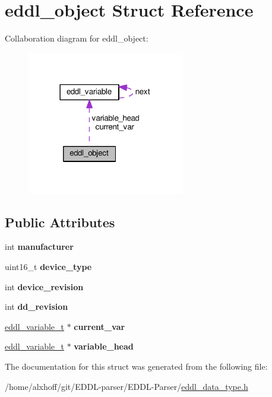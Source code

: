 \hypertarget{structeddl__object}{}\section{eddl\+\_\+object Struct Reference}
\label{structeddl__object}


Collaboration diagram for eddl\+\_\+object\+:\nopagebreak
\begin{figure}[H]
\begin{center}
\leavevmode
\includegraphics[width=194pt]{structeddl__object__coll__graph}
\end{center}
\end{figure}
\subsection*{Public Attributes}
\begin{DoxyCompactItemize}
\item 
int {\bfseries manufacturer}\hypertarget{structeddl__object_a068ca2f55a0ca714f6ae4081404ebcb8}{}\label{structeddl__object_a068ca2f55a0ca714f6ae4081404ebcb8}

\item 
uint16\+\_\+t {\bfseries device\+\_\+type}\hypertarget{structeddl__object_a011fbc1d6251efff7fc59e2e3862c3f8}{}\label{structeddl__object_a011fbc1d6251efff7fc59e2e3862c3f8}

\item 
int {\bfseries device\+\_\+revision}\hypertarget{structeddl__object_a0a81761adddc6f99ae2a9ed0203030c1}{}\label{structeddl__object_a0a81761adddc6f99ae2a9ed0203030c1}

\item 
int {\bfseries dd\+\_\+revision}\hypertarget{structeddl__object_a3194adb5ded71f027deae08e8add77bf}{}\label{structeddl__object_a3194adb5ded71f027deae08e8add77bf}

\item 
\hyperlink{structeddl__variable}{eddl\+\_\+variable\+\_\+t} $\ast$ {\bfseries current\+\_\+var}\hypertarget{structeddl__object_ac62753f0861985630e571401fa837268}{}\label{structeddl__object_ac62753f0861985630e571401fa837268}

\item 
\hyperlink{structeddl__variable}{eddl\+\_\+variable\+\_\+t} $\ast$ {\bfseries variable\+\_\+head}\hypertarget{structeddl__object_a0e174cf7f483bf8186502c7832cb682d}{}\label{structeddl__object_a0e174cf7f483bf8186502c7832cb682d}

\end{DoxyCompactItemize}


The documentation for this struct was generated from the following file\+:\begin{DoxyCompactItemize}
\item 
/home/alxhoff/git/\+E\+D\+D\+L-\/parser/\+E\+D\+D\+L-\/\+Parser/\hyperlink{eddl__data__type_8h}{eddl\+\_\+data\+\_\+type.\+h}\end{DoxyCompactItemize}
